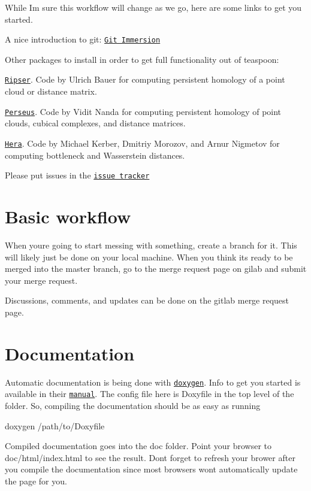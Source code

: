 While I\textquotesingle{}m sure this workflow will change as we go, here are some links to get you started.


\begin{DoxyItemize}
\item A nice introduction to git\+: \href{http://gitimmersion.com/}{\tt Git Immersion}
\item Other packages to install in order to get full functionality out of teaspoon\+:
\begin{DoxyItemize}
\item \href{https://github.com/Ripser/ripser}{\tt Ripser}. Code by Ulrich Bauer for computing persistent homology of a point cloud or distance matrix.
\item \href{http://people.maths.ox.ac.uk/nanda/perseus/index.html}{\tt Perseus}. Code by Vidit Nanda for computing persistent homology of point clouds, cubical complexes, and distance matrices.
\item \href{https://bitbucket.org/grey_narn/hera}{\tt Hera}. Code by Michael Kerber, Dmitriy Morozov, and Arnur Nigmetov for computing bottleneck and Wasserstein distances.
\end{DoxyItemize}
\item Please put issues in the \href{https://gitlab.msu.edu/TSAwithTDA/teaspoon/issues}{\tt issue tracker}
\end{DoxyItemize}

\section*{Basic workflow}

When you\textquotesingle{}re going to start messing with something, create a branch for it. This will likely just be done on your local machine. When you think it\textquotesingle{}s ready to be merged into the master branch, go to the merge request page on gilab and submit your merge request.

Discussions, comments, and updates can be done on the gitlab merge request page.

\section*{Documentation}

Automatic documentation is being done with \href{www.doxygen.org}{\tt doxygen}. Info to get you started is available in their \href{http://www.stack.nl/~dimitri/doxygen/manual/index.html}{\tt manual}. The config file here is {\ttfamily Doxyfile} in the top level of the folder. So, compiling the documentation should be as easy as running
\begin{DoxyCode}
doxygen /path/to/Doxyfile
\end{DoxyCode}
 Compiled documentation goes into the {\ttfamily doc} folder. Point your browser to {\ttfamily doc/html/index.\+html} to see the result. Don\textquotesingle{}t forget to refresh your brower after you compile the documentation since most browsers won\textquotesingle{}t automatically update the page for you.

